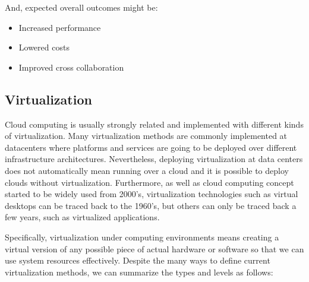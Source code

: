 And, expected overall outcomes might be:

\begin{itemize}
\item Increased performance
\item Lowered costs
\item Improved cross collaboration
\end{itemize}



\subsection{Virtualization}\label{SOA:Virtualization}

Cloud computing is usually strongly related and implemented with different kinds of virtualization. Many virtualization methods are commonly implemented at datacenters where platforms and services are going to be deployed over different infrastructure architectures. Nevertheless, deploying virtualization at data centers does not automatically mean running over a cloud and it is possible to deploy clouds without virtualization. Furthermore, as well as cloud computing concept started to be widely used from 2000's, virtualization  technologies such as virtual desktops can be traced back to the 1960’s, but others can only be traced back a few years, such as virtualized applications.

Specifically, virtualization under computing environments means creating a virtual version of any possible piece of actual hardware or software so that we can use system resources effectively. Despite the many ways to define current virtualization methods, we can summarize the types and levels as follows:

